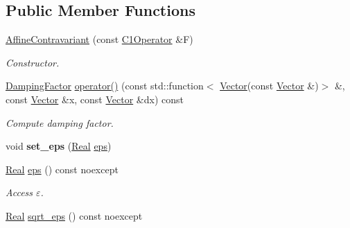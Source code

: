\subsection*{Public Member Functions}
\begin{DoxyCompactItemize}
\item 
\hypertarget{classSpacy_1_1Newton_1_1Damping_1_1AffineContravariant_afbb2954f22af6d8248ec9c382a5b1ccd}{\hyperlink{classSpacy_1_1Newton_1_1Damping_1_1AffineContravariant_afbb2954f22af6d8248ec9c382a5b1ccd}{Affine\-Contravariant} (const \hyperlink{classSpacy_1_1C1Operator}{C1\-Operator} \&F)}\label{classSpacy_1_1Newton_1_1Damping_1_1AffineContravariant_afbb2954f22af6d8248ec9c382a5b1ccd}

\begin{DoxyCompactList}\small\item\em Constructor. \end{DoxyCompactList}\item 
\hyperlink{classSpacy_1_1DampingFactor}{Damping\-Factor} \hyperlink{classSpacy_1_1Newton_1_1Damping_1_1AffineContravariant_a494dcf0e1c7837b4b6bd18107efcfe0b}{operator()} (const std\-::function$<$ \hyperlink{classSpacy_1_1Vector}{Vector}(const \hyperlink{classSpacy_1_1Vector}{Vector} \&)$>$ \&, const \hyperlink{classSpacy_1_1Vector}{Vector} \&x, const \hyperlink{classSpacy_1_1Vector}{Vector} \&dx) const 
\begin{DoxyCompactList}\small\item\em Compute damping factor. \end{DoxyCompactList}\item 
\hypertarget{classSpacy_1_1Mixin_1_1Eps_a818ab6dfab5e4eea583e1302bcc621f8}{void {\bfseries set\-\_\-eps} (\hyperlink{classSpacy_1_1Real}{Real} \hyperlink{classSpacy_1_1Mixin_1_1Eps_a812b99b0abc1d78a34b4114907f23f52}{eps})}\label{classSpacy_1_1Mixin_1_1Eps_a818ab6dfab5e4eea583e1302bcc621f8}

\item 
\hypertarget{classSpacy_1_1Mixin_1_1Eps_a812b99b0abc1d78a34b4114907f23f52}{\hyperlink{classSpacy_1_1Real}{Real} \hyperlink{classSpacy_1_1Mixin_1_1Eps_a812b99b0abc1d78a34b4114907f23f52}{eps} () const noexcept}\label{classSpacy_1_1Mixin_1_1Eps_a812b99b0abc1d78a34b4114907f23f52}

\begin{DoxyCompactList}\small\item\em Access $\varepsilon$. \end{DoxyCompactList}\item 
\hypertarget{classSpacy_1_1Mixin_1_1Eps_a1c1b0ed7f14ed4967dc7da9295a136d4}{\hyperlink{classSpacy_1_1Real}{Real} \hyperlink{classSpacy_1_1Mixin_1_1Eps_a1c1b0ed7f14ed4967dc7da9295a136d4}{sqrt\-\_\-eps} () const noexcept}\label{classSpacy_1_1Mixin_1_1Eps_a1c1b0ed7f14ed4967dc7da9295a136d4}


\end{DoxyCompactItemize}
